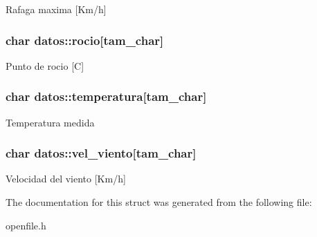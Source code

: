 Rafaga maxima \mbox{[}Km/h\mbox{]} \hypertarget{structdatos_ac93660891013484981943e2fe32ecfc2}{
\subsubsection[{rocio}]{\setlength{\rightskip}{0pt plus 5cm}char datos\-::rocio\mbox{[}tam\-\_\-char\mbox{]}}}\label{structdatos_ac93660891013484981943e2fe32ecfc2}
Punto de rocio \mbox{[}C\mbox{]} \hypertarget{structdatos_ac60aa86adb8352bd11c92b136c252ef9}{
\subsubsection[{temperatura}]{\setlength{\rightskip}{0pt plus 5cm}char datos\-::temperatura\mbox{[}tam\-\_\-char\mbox{]}}}\label{structdatos_ac60aa86adb8352bd11c92b136c252ef9}
Temperatura medida \hypertarget{structdatos_aaa992bcb3c7b2710e7c00db890c4c60c}{
\subsubsection[{vel\-\_\-viento}]{\setlength{\rightskip}{0pt plus 5cm}char datos\-::vel\-\_\-viento\mbox{[}tam\-\_\-char\mbox{]}}}\label{structdatos_aaa992bcb3c7b2710e7c00db890c4c60c}
Velocidad del viento \mbox{[}Km/h\mbox{]} 

The documentation for this struct was generated from the following file\-:\begin{DoxyCompactItemize}
\item 
openfile.\-h\end{DoxyCompactItemize}
